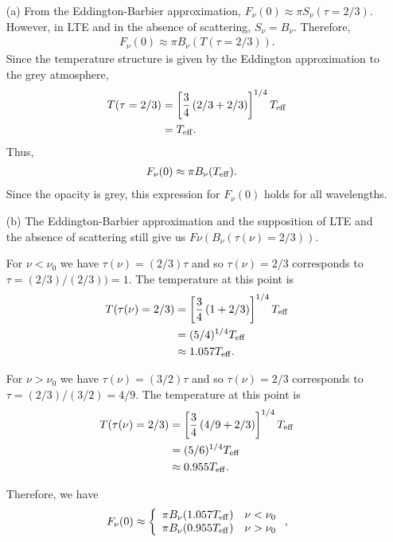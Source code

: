 \begin{problem}
\begin{enumerate}
\item[(a)]
From the Eddington-Barbier approximation, $F_\nu(0) \approx \pi S_\nu(\tau = 2/3)$. However, in LTE and in the absence of scattering, $S_\nu = B_\nu$. Therefore,
\begin{align}
F_\nu(0) \approx \pi B_\nu(T(\tau = 2/3)).
\end{align}
Since the temperature structure is given by the Eddington approximation to the grey atmosphere,
\begin{align}
T(\tau = 2/3) &= \left[\frac{3}{4}\left(2/3+2/3\right)\right]^{1/4}T_\mathrm{eff}\\
& = T_\mathrm{eff}.
\end{align}
Thus, 
\begin{align}
F_\nu(0) &\approx \pi B_\nu(T_\mathrm{eff}).
\end{align}
Since the opacity is grey, this expression for $F_\nu(0)$ holds for all wavelengths.

\item[(b)]
The Eddington-Barbier approximation and the supposition of LTE and the absence of scattering still give us $F\nu(B_\nu(\tau(\nu)=2/3))$. 

For $\nu < \nu_0$ we have $\tau(\nu) = (2/3)\tau$ and so $\tau(\nu) = 2/3$ corresponds to $\tau = (2/3)/(2/3) ) = 1$. The temperature at this point is 
\begin{align}
T(\tau(\nu) = 2/3) &=\left[\frac{3}{4}\left(1+2/3\right)\right]^{1/4}T_\mathrm{eff}\\
&= (5/4)^{1/4}T_\mathrm{eff}\\
&\approx 1.057T_\mathrm{eff}.
\end{align}

For $\nu > \nu_0$ we have $\tau(\nu) = (3/2)\tau$ and so $\tau(\nu) = 2/3$ corresponds to $\tau = (2/3)/(3/2) = 4/9$. The temperature at this point is 
\begin{align}
T(\tau(\nu) = 2/3) &=\left[\frac{3}{4}\left(4/9+2/3\right)\right]^{1/4}T_\mathrm{eff}\\
&= (5/6)^{1/4}T_\mathrm{eff}\\
&\approx 0.955T_\mathrm{eff}.
\end{align}


Therefore, we have
\begin{align}
F_\nu(0) \approx \left\{\begin{array}{ll}\pi B_\nu(1.057T_\mathrm{eff})&\nu < \nu_0\\\pi B_\nu(0.955T_\mathrm{eff})&\nu > \nu_0\end{array}\right.,
\end{align}


\end{enumerate}
\end{problem}
